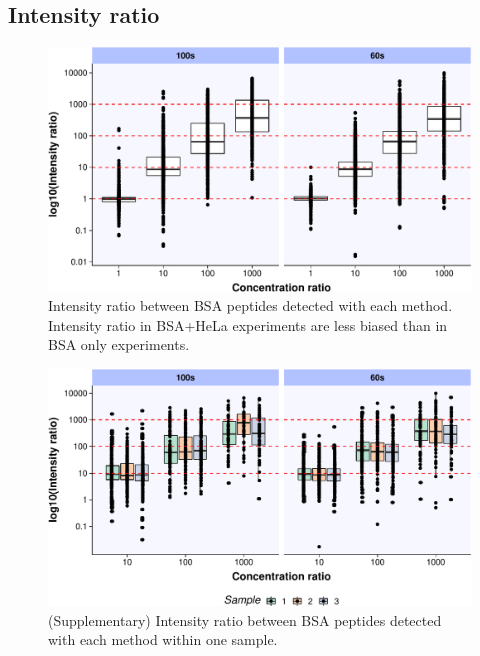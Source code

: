 \documentclass[]{article}
\begin{document}
\newpage

\hypertarget{intensity-ratio-1}{%
\subsection{Intensity ratio}\label{intensity-ratio-1}}

\begin{figure}
\centering
\includegraphics{BSA_files/figure-latex/unnamed-chunk-7-1.pdf}
\caption{\label{fig:unnamed-chunk-7}Intensity ratio between BSA peptides detected with each method. Intensity ratio in BSA+HeLa experiments are less biased than in BSA only experiments.}
\end{figure}

\begin{figure}
\centering
\includegraphics{BSA_files/figure-latex/unnamed-chunk-8-1.pdf}
\caption{\label{fig:unnamed-chunk-8}(Supplementary) Intensity ratio between BSA peptides detected with each method within one sample.}
\end{figure}
\end{document}
